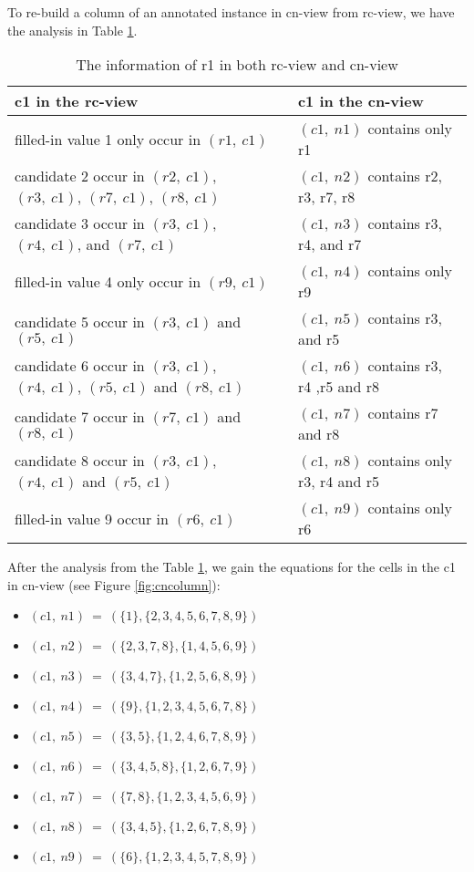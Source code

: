 \documentclass[11pt]{report}
\newcommand{\set}[1]{\{ #1 \}}
\begin{document}
To re-build a column of an annotated instance in cn-view from rc-view, we have the analysis in Table \ref{tab:rcandcn}.
\begin{table}
\begin{center}
  \begin{tabular}{|p{7cm}|p{7cm}|}
    \hline
    \textbf{c1 in the rc-view} & \textbf{c1 in the cn-view} \\ \hline
    filled-in value 1 only occur in $(r1,\ c1)$ & $(c1,\ n1)$ contains only r1\\ \hline
    candidate 2 occur in $(r2,\ c1)$, $(r3,\ c1)$, $(r7,\ c1)$, $(r8,\ c1)$ & $(c1,\ n2)$ contains r2, r3, r7, r8 \\ \hline
    candidate 3 occur in $(r3,\ c1)$,  $(r4,\ c1)$, and $(r7,\ c1)$ & $(c1,\ n3)$ contains r3, r4, and r7 \\ \hline
    filled-in value 4 only occur in $(r9,\ c1)$ & $(c1,\ n4)$ contains only r9 \\ \hline
    candidate 5 occur in $(r3,\ c1)$ and $(r5,\ c1)$ & $(c1,\ n5)$ contains r3, and r5 \\ \hline
    candidate 6 occur in $(r3,\ c1)$,  $(r4,\ c1)$, $(r5,\ c1)$ and $(r8,\ c1)$ & $(c1,\ n6)$ contains r3, r4 ,r5 and r8 \\ \hline
    candidate 7 occur in $(r7,\ c1)$ and $(r8,\ c1)$ & $(c1,\ n7)$ contains r7 and r8\\ \hline
    candidate 8 occur in $(r3,\ c1)$,  $(r4,\ c1)$ and $(r5,\ c1)$ & $(c1,\ n8)$ contains only r3, r4 and r5 \\ \hline
    filled-in value 9 occur in $(r6,\ c1)$ & $(c1,\ n9)$ contains only r6 \\ \hline
  \end{tabular}
\caption{The information of r1 in both rc-view and cn-view}
\label{tab:rcandcn}
\end{center}
\end{table}

After the analysis from the Table \ref{tab:rcandcn}, we gain the equations for the cells in the c1 in cn-view (see Figure \ref{fig:cncolumn}):
\begin{itemize}
\item $(c1,\ n1)\ =\ (\set{1}, \set{2, 3, 4, 5, 6, 7, 8, 9})$
\item $(c1,\ n2)\ =\ (\set{2, 3, 7, 8}, \set{1, 4, 5, 6, 9})$
\item $(c1,\ n3)\ =\ (\set{3, 4, 7}, \set{1, 2, 5, 6, 8, 9})$
\item $(c1,\ n4)\ =\ (\set{9}, \set{1, 2, 3, 4, 5, 6, 7, 8})$
\item $(c1,\ n5)\ =\ (\set{3, 5}, \set{1, 2, 4, 6, 7, 8, 9})$
\item $(c1,\ n6)\ =\ (\set{3, 4, 5, 8}, \set{1, 2, 6, 7, 9})$
\item $(c1,\ n7)\ =\ (\set{7, 8}, \set{1, 2, 3, 4, 5, 6, 9})$
\item $(c1,\ n8)\ =\ (\set{3, 4, 5}, \set{1, 2, 6, 7, 8, 9})$
\item $(c1,\ n9)\ =\ (\set{6}, \set{1, 2, 3, 4, 5, 7, 8, 9})$
\end{itemize}
\end{document}
